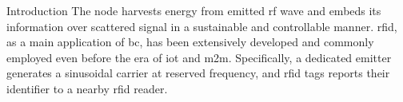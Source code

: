 \documentclass[journal]{IEEEtran}
\begin{document}
\begin{section}{Introduction}
	The node harvests energy from emitted \gls{rf} wave and embeds its information over scattered signal in a sustainable and controllable manner.
	\gls{rfid}, as a main application of \gls{bc}, has been extensively developed and commonly employed even before the era of \gls{iot} and \gls{m2m}.
	Specifically, a dedicated emitter generates a sinusoidal carrier at reserved frequency, and \gls{rfid} tags reports their identifier to a nearby \gls{rfid} reader.










\end{section}
\end{document}
